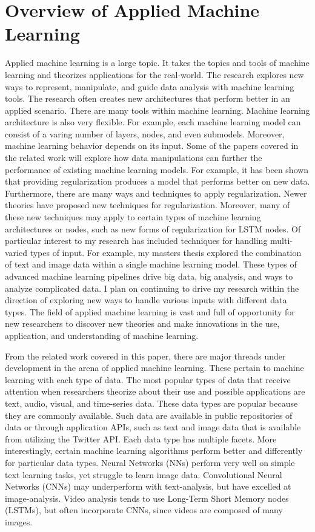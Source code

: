 \section{Overview of Applied Machine Learning}

Applied machine learning is a large topic.  It takes the topics and tools of machine learning and theorizes applications for the real-world.  The research explores new ways to represent, manipulate, and guide data analysis with machine learning tools.  The research often creates new architectures that perform better in an applied scenario. There are many tools within machine learning.  Machine learning architecture is also very flexible.  For example, each machine learning model can consist of a varing number of layers, nodes, and even submodels.  Moreover, machine learning behavior depends on its input.  Some of the papers covered in the related work will explore how data manipulations can further the performance of existing machine learning models.  For example, it has been shown that providing regularization produces a model that performs better on new data.  Furthermore, there are many ways and techniques to apply regularization.  Newer theories have proposed new techniques for regularization.  Moreover, many of these new techniques may apply to certain types of machine learning architectures or nodes, such as new forms of regularization for LSTM nodes.  Of particular interest to my research has included techniques for handling multi-varied types of input.  For example, my masters thesis explored the combination of text and image data within a single machine learning model.  These types of advanced machine learning pipelines drive big data, big analysis, and ways to analyze complicated data.  I plan on continuing to drive my research within the direction of exploring new ways to handle various inputs with different data types.  The field of applied machine learning is vast and full of opportunity for new researchers to discover new theories and make innovations in the use, application, and understanding of machine learning.


From the related work covered in this paper, there are major threads under development in the arena of applied machine learning.  These pertain to machine learning with each type of data.  The most popular types of data that receive attention when researchers theorize about their use and possible applications are text, audio, visual, and time-series data.  These data types are popular because they are commonly available.  Such data are available in public repositories of data or through application APIs, such as text and image data that is available from utilizing the Twitter API.  Each data type has multiple facets.  More interestingly, certain machine learning algorithms perform better and differently for particular data types.  Neural Networks (NNs) perform very well on simple text learning tasks, yet struggle to learn image data.  Convolutional Neural Networks (CNNs) may underperform with text-analysis, but have excelled at image-analysis.  Video analysis tends to use Long-Term Short Memory nodes (LSTMs), but often incorporate CNNs, since videos are composed of many images.

